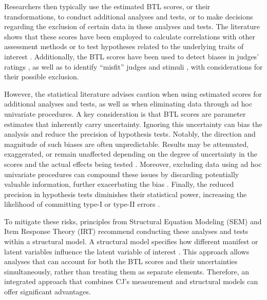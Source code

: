 \documentclass[
  authoryear,
  preprint,
  1p]{elsarticle}
\begin{document}
Researchers then typically use the estimated BTL scores, or their
transformations, to conduct additional analyses and tests, or to make
decisions regarding the exclusion of certain data in these analyses and
tests. The literature shows that these scores have been employed to
calculate correlations with other assessment methods
\citep{Goossens_et_al_2018, Bouwer_et_al_2023} or to test hypotheses
related to the underlying traits of interest
\citep{Bramley_et_al_2019, Boonen_et_al_2020, Bouwer_et_al_2023, vanDaal_et_al_2017, Jones_et_al_2019, Gijsen_et_al_2021}.
Additionally, the BTL scores have been used to detect biases in judges'
ratings \citep{Pollitt_et_al_2003, Pollitt_2012b}, as well as to
identify ``misfit'' judges and stimuli
\citep{Pollitt_2012b, vanDaal_et_al_2017, Goossens_et_al_2018}, with
considerations for their possible exclusion.

However, the statistical literature advises caution when using estimated
scores for additional analyses and tests, as well as when eliminating
data through ad hoc univariate procedures. A key consideration is that
BTL scores are parameter estimates that inherently carry uncertainty.
Ignoring this uncertainty can bias the analysis and reduce the precision
of hypothesis tests. Notably, the direction and magnitude of such biases
are often unpredictable. Results may be attenuated, exaggerated, or
remain unaffected depending on the degree of uncertainty in the scores
and the actual effects being tested
\citetext{\citealp[pp.~25]{Kline_et_al_2023}; \citealp[pp.~137]{Hoyle_et_al_2023}}.
Moreover, excluding data using ad hoc univariate procedures can compound
these issues by discarding potentially valuable information, further
exacerbating the bias \citep{Zimmerman_1994, McElreath_2020}. Finally,
the reduced precision in hypothesis tests diminishes their statistical
power, increasing the likelihood of committing type-I or type-II errors
\citep{McElreath_2020}.

To mitigate these risks, principles from Structural Equation Modeling
(SEM) \citep[pp.~138]{Hoyle_et_al_2023} and Item Response Theory (IRT)
\citetext{\citealp[chap.~6]{Fox_2010}; \citealp[chap.~24]{vanderLinden_et_al_2017_I}}
recommend conducting these analyses and tests within a structural model.
A structural model specifies how different manifest or latent variables
influence the latent variable of interest \citep{Everitt_et_al_2010}.
This approach allows analyses that can account for both the BTL scores
and their uncertainties simultaneously, rather than treating them as
separate elements. Therefore, an integrated approach that combines CJ's
measurement and structural models can offer significant advantages.
\end{document}
